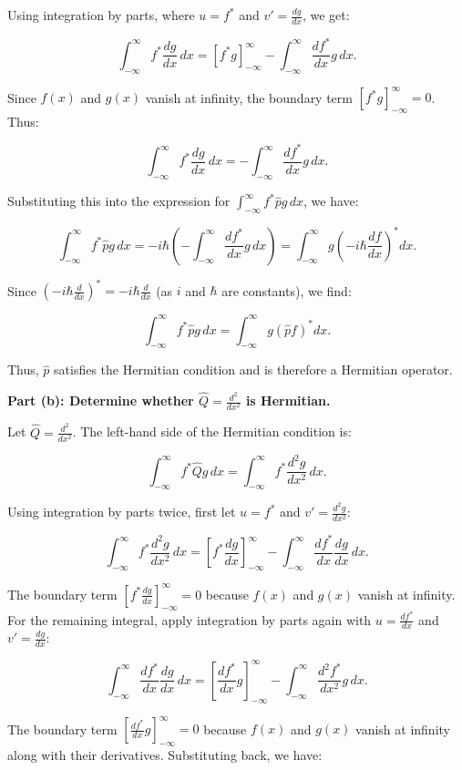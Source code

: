 \documentclass{article}
\begin{document}
Using integration by parts, where $u = f^*$ and $v' = \frac{dg}{dx}$, we get:

\[
\int_{-\infty}^\infty f^* \frac{d g}{dx} \, dx = \left[ f^* g \right]_{-\infty}^\infty - \int_{-\infty}^\infty \frac{d f^*}{dx} g \, dx.
\]

Since $f(x)$ and $g(x)$ vanish at infinity, the boundary term $\left[ f^* g \right]_{-\infty}^\infty = 0$. Thus:

\[
\int_{-\infty}^\infty f^* \frac{d g}{dx} \, dx = - \int_{-\infty}^\infty \frac{d f^*}{dx} g \, dx.
\]

Substituting this into the expression for $\int_{-\infty}^\infty f^* \hat{p} g \, dx$, we have:

\[
\int_{-\infty}^\infty f^* \hat{p} g \, dx = -i\hbar \left(- \int_{-\infty}^\infty \frac{d f^*}{dx} g \, dx \right) = \int_{-\infty}^\infty g \left(-i\hbar \frac{d f}{dx}\right)^* dx.
\]

Since $(-i\hbar \frac{d}{dx})^* = -i\hbar \frac{d}{dx}$ (as $i$ and $\hbar$ are constants), we find:

\[
\int_{-\infty}^\infty f^* \hat{p} g \, dx = \int_{-\infty}^\infty g (\hat{p} f)^* dx.
\]

Thus, $\hat{p}$ satisfies the Hermitian condition and is therefore a Hermitian operator. 

\textbf{Part (b): Determine whether $\hat{Q} = \frac{d^2}{dx^2}$ is Hermitian.}

Let $\hat{Q} = \frac{d^2}{dx^2}$. The left-hand side of the Hermitian condition is:

\[
\int_{-\infty}^\infty f^* \hat{Q} g \, dx = \int_{-\infty}^\infty f^* \frac{d^2 g}{dx^2} \, dx.
\]

Using integration by parts twice, first let $u = f^*$ and $v' = \frac{d^2 g}{dx^2}$:

\[
\int_{-\infty}^\infty f^* \frac{d^2 g}{dx^2} \, dx = \left[ f^* \frac{d g}{dx} \right]_{-\infty}^\infty - \int_{-\infty}^\infty \frac{d f^*}{dx} \frac{d g}{dx} \, dx.
\]

The boundary term $\left[ f^* \frac{d g}{dx} \right]_{-\infty}^\infty = 0$ because $f(x)$ and $g(x)$ vanish at infinity. For the remaining integral, apply integration by parts again with $u = \frac{d f^*}{dx}$ and $v' = \frac{d g}{dx}$:

\[
\int_{-\infty}^\infty \frac{d f^*}{dx} \frac{d g}{dx} \, dx = \left[ \frac{d f^*}{dx} g \right]_{-\infty}^\infty - \int_{-\infty}^\infty \frac{d^2 f^*}{dx^2} g \, dx.
\]

The boundary term $\left[ \frac{d f^*}{dx} g \right]_{-\infty}^\infty = 0$ because $f(x)$ and $g(x)$ vanish at infinity along with their derivatives. Substituting back, we have:
\end{document}
